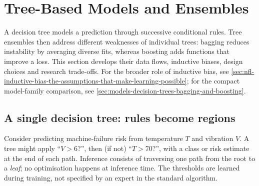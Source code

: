 \chapter{Tree-Based Models and Ensembles}
\label{chap:trees}
A decision tree models a prediction through successive conditional rules.
Tree ensembles then address different weaknesses of individual trees: bagging reduces instability by averaging diverse fits, whereas boosting adds functions that improve a loss.
This section develops their data flows, inductive biases, design choices and research trade-offs.
For the broader role of inductive bias, see \cref{sec:nfl-inductive-bias-the-assumptions-that-make-learning-possible}; for the compact model-family comparison, see \cref{sec:models-decision-trees-bagging-and-boosting}.

\section{A single decision tree: rules become regions}
\label{sec:trees-a-single-decision-tree-rules-become-regions}
Consider predicting machine-failure risk from temperature $T$ and vibration $V$.
A tree might apply ``$V>6$?'', then (if not) ``$T>70$?'', with a class or risk estimate at the end of each path.
Inference consists of traversing one path from the root to a \emph{leaf}; no optimisation happens at inference time.
The thresholds are learned during training, not specified by an expert in the standard algorithm.

